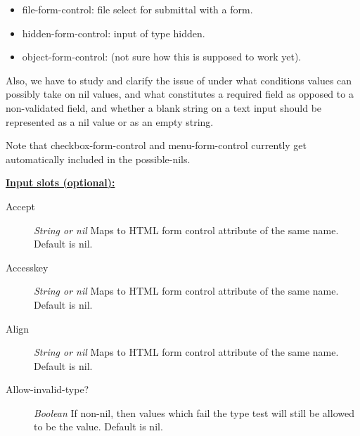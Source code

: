 \documentclass [11pt]{book}
\begin{document}
\begin{itemize}
\begin{description}
\begin{enumerate}
\begin{itemize}
\item file-form-control: file select for submittal with a form.
      

\item hidden-form-control: input of type hidden.
      

\item object-form-control: (not sure how this is supposed to work yet).
    

\end{itemize}



\end{enumerate}




Also, we have to study and clarify the issue of under what conditions values can possibly take on nil values, 
and what constitutes a required field as opposed to a non-validated field, and whether a blank string on a text
input should be represented as a nil value or as an empty string.

Note that checkbox-form-control and menu-form-control currently get automatically included in the possible-nils.






\end{description}








\textbf{
\underline{Input slots (optional):}}

\begin{description}

\item [Accept]
\emph{String or nil} Maps to HTML form control attribute of the same name. Default is nil.


\item [Accesskey]
\emph{String or nil} Maps to HTML form control attribute of the same name. Default is nil.


\item [Align]
\emph{String or nil} Maps to HTML form control attribute of the same name. Default is nil.


\item [Allow-invalid-type?]
\emph{Boolean} If non-nil, then values which fail the type test will still be allowed to be the value. Default is nil.



\end{description}
\end{itemize}
\end{document}
